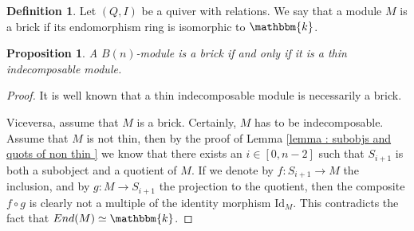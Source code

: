 \documentclass[11pt]{amsart}
\newtheorem{proposition}[theorem]{Proposition}
\theoremstyle{definition}
\newtheorem{definition}[theorem]{Definition}
\newcommand{\kk}{\mathbbm{k}}
\begin{document}
\begin{definition} Let $(Q,I)$ be a quiver with relations. We say that a module $M$ is a brick if its endomorphism ring is isomorphic to $\kk$.
\end{definition}

\begin{proposition}\label{prop:  brick IFF thin incecomposable}
    A $B(n)$-module is a brick if and only if it is a thin indecomposable module.
\end{proposition}
\begin{proof}
    It is well known that a thin indecomposable module is necessarily a brick. 
    
    Viceversa, assume that $M$ is a brick. Certainly, $M$ has to be indecomposable. Assume that $M$ is not thin, then by  the proof of Lemma \ref{lemma : subobjs and quots of non thin } we know that there exists an $i\in [0,n-2]$ such that $S_{i+1}$ is both a subobject and a quotient of $M$. If we denote by $f:S_{i+1}\rightarrow M$ the inclusion, and by $g:M\rightarrow S_{i+1}$ the projection to the quotient, then the composite $f\circ g$ is clearly not a multiple of the identity morphism $\textrm{Id}_M$. This contradicts the fact that $\textrm{End}(M)\simeq \kk$. 
   
\end{proof}
\end{document}
